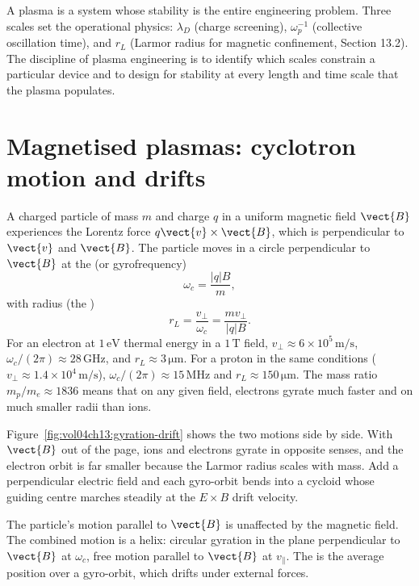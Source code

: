 \begin{archetype}
A plasma is a system whose stability is the entire engineering
problem. Three scales set the operational physics: $\lambda_{D}$
(charge screening), $\omega_{p}^{-1}$ (collective oscillation time),
and $r_{L}$ (Larmor radius for magnetic confinement, Section 13.2).
The discipline of plasma engineering is to identify which scales
constrain a particular device and to design for stability at every
length and time scale that the plasma populates.
\end{archetype}

\section{Magnetised plasmas: cyclotron motion and drifts}

A charged particle of mass $m$ and charge $q$ in a uniform magnetic
field $\vect{B}$ experiences the Lorentz force $q\vect{v}\times
\vect{B}$, which is perpendicular to $\vect{v}$ and $\vect{B}$. The
particle moves in a circle perpendicular to $\vect{B}$ at the
 (or gyrofrequency)
\[
\omega_{c} = \frac{|q|B}{m},
\]
with radius (the )
\[
r_{L} = \frac{v_{\perp}}{\omega_{c}} = \frac{mv_{\perp}}{|q|B}.
\]
For an electron at $1\,\si{\electronvolt}$ thermal energy in a
$1\,\si{\tesla}$ field, $v_{\perp}\approx 6\times 10^{5}\,\si{\meter
\per\second}$, $\omega_{c}/(2\pi)\approx 28\,\si{\giga\hertz}$, and
$r_{L}\approx 3\,\si{\micro\meter}$. For a proton in the same
conditions ($v_{\perp}\approx 1.4\times 10^{4}\,\si{\meter\per
\second}$), $\omega_{c}/(2\pi)\approx 15\,\si{\mega\hertz}$ and
$r_{L}\approx 150\,\si{\micro\meter}$. The mass ratio $m_{p}/m_{e}
\approx 1836$ means that on any given field, electrons gyrate much
faster and on much smaller radii than ions.



Figure~\ref{fig:vol04ch13:gyration-drift} shows the two motions side by
side. With $\vect{B}$ out of the page, ions and electrons gyrate in
opposite senses, and the electron orbit is far smaller because the Larmor
radius scales with mass. Add a perpendicular electric field and each
gyro-orbit bends into a cycloid whose guiding centre marches steadily at
the $E\times B$ drift velocity.

The particle's motion parallel to $\vect{B}$ is unaffected by the
magnetic field. The combined motion is a helix: circular gyration
in the plane perpendicular to $\vect{B}$ at $\omega_{c}$, free motion
parallel to $\vect{B}$ at $v_{\parallel}$. The  is the average position over a gyro-orbit, which drifts under
external forces.

